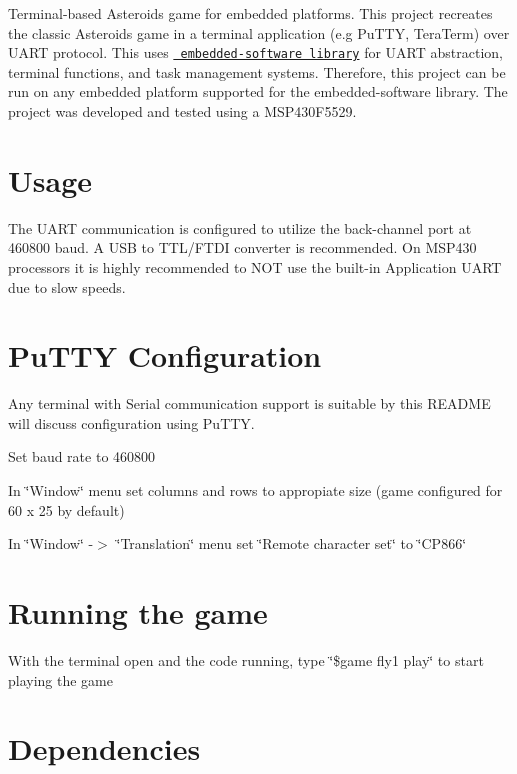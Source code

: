 

 Terminal-\/based Asteroids game for embedded platforms. This project recreates the classic Asteroids game in a terminal application (e.\+g Pu\+T\+TY, Tera\+Term) over U\+A\+RT protocol. This uses \href{https://github.com/muhlbaier/embedded-software}{\texttt{ embedded-\/software library}} for U\+A\+RT abstraction, terminal functions, and task management systems. Therefore, this project can be run on any embedded platform supported for the embedded-\/software library. The project was developed and tested using a M\+S\+P430\+F5529.\hypertarget{index_usage}{}\section{Usage}\label{index_usage}
The U\+A\+RT communication is configured to utilize the back-\/channel port at 460800 baud. A U\+SB to T\+T\+L/\+F\+T\+DI converter is recommended. On M\+S\+P430 processors it is highly recommended to N\+OT use the built-\/in Application U\+A\+RT due to slow speeds.\hypertarget{index_putty_config}{}\section{Pu\+T\+T\+Y Configuration}\label{index_putty_config}
Any terminal with Serial communication support is suitable by this R\+E\+A\+D\+ME will discuss configuration using Pu\+T\+TY.
\begin{DoxyItemize}
\item Set baud rate to 460800
\item In \char`\"{}\+Window\char`\"{} menu set columns and rows to appropiate size (game configured for 60 x 25 by default)
\item In \char`\"{}\+Window\char`\"{} -\/$>$ \char`\"{}\+Translation\char`\"{} menu set \char`\"{}\+Remote character set\char`\"{} to \char`\"{}\+C\+P866\char`\"{}
\end{DoxyItemize}\hypertarget{index_running_game}{}\section{Running the game}\label{index_running_game}
With the terminal open and the code running, type \char`\"{}\$game fly1 play\char`\"{} to start playing the game 
\begin{DoxyCode}{0}
\end{DoxyCode}
\hypertarget{index_prereq}{}\section{Dependencies}\label{index_prereq}
